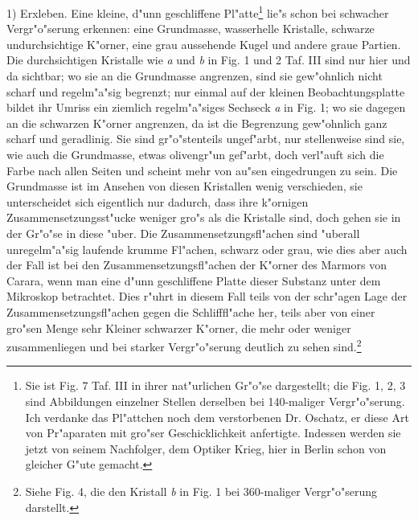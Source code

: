 \documentclass[a4paper, 11pt, oneside, german]{article}
\begin{document}
1) Erxleben. Eine kleine, d"unn geschliffene Pl"atte\footnote{Sie ist Fig. 7 Taf. III in ihrer nat"urlichen Gr"o"se dargestellt; die Fig. 1, 2, 3 sind Abbildungen einzelner Stellen derselben bei 140-maliger Vergr"o"serung. Ich verdanke das Pl"attchen noch dem verstorbenen Dr. Oschatz, er diese Art von Pr"aparaten mit gro"ser Geschicklichkeit anfertigte. Indessen werden sie jetzt von seinem Nachfolger, dem Optiker Krieg, hier in Berlin schon von gleicher G"ute gemacht.} lie"s schon bei schwacher Vergr"o"serung erkennen: eine Grundmasse, wasserhelle Kristalle, schwarze undurchsichtige K"orner, eine grau aussehende Kugel und andere graue Partien. Die durchsichtigen Kristalle wie \emph{a} und \emph{b} in Fig. 1 und 2 Taf. III sind nur hier und da sichtbar; wo sie an die Grundmasse angrenzen, sind sie gew"ohnlich nicht scharf und regelm"a"sig begrenzt; nur einmal auf der kleinen Beobachtungsplatte bildet ihr Umriss ein ziemlich regelm"a"siges Sechseck \emph{a} in Fig. 1; wo sie dagegen an die schwarzen K"orner angrenzen, da ist die Begrenzung gew"ohnlich ganz scharf und geradlinig. Sie sind gr"o"stenteils ungef"arbt, nur stellenweise sind sie, wie auch die Grundmasse, etwas olivengr"un gef"arbt, doch verl"auft sich die Farbe nach allen Seiten und scheint mehr von au"sen eingedrungen zu sein. Die Grundmasse ist im Ansehen von diesen Kristallen wenig verschieden, sie unterscheidet sich eigentlich nur dadurch, dass ihre k"ornigen Zusammensetzungsst"ucke weniger gro"s als die Kristalle sind, doch gehen sie in der Gr"o"se in diese "uber. Die Zusammensetzungsfl"achen sind "uberall unregelm"a"sig laufende krumme Fl"achen, schwarz oder grau, wie dies aber auch der Fall ist bei den Zusammensetzungsfl"achen der K"orner des Marmors von Carara, wenn man eine d"unn geschliffene Platte dieser Substanz unter dem Mikroskop betrachtet. Dies r"uhrt in diesem Fall teils von der schr"agen Lage der Zusammensetzungsfl"achen gegen die Schlifffl"ache her, teils aber von einer gro"sen Menge sehr Kleiner schwarzer K"orner, die mehr oder weniger zusammenliegen und bei starker Vergr"o"serung deutlich zu sehen sind.\footnote{Siehe Fig. 4, die den Kristall \emph{b} in Fig. 1 bei 360-maliger Vergr"o"serung darstellt.}
\end{document}

